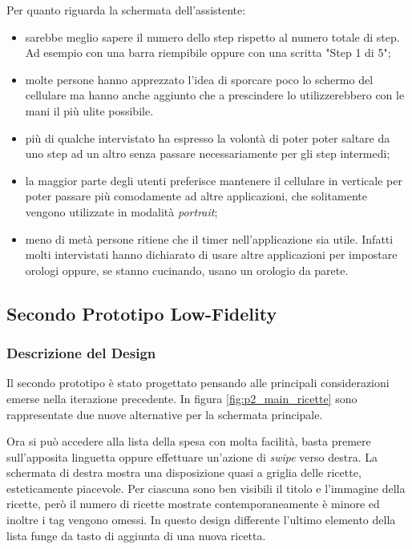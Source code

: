 Per quanto riguarda la schermata dell'assistente:
\begin{itemize}
  \item sarebbe meglio sapere il numero dello step rispetto al numero totale di step.
    Ad esempio con una barra riempibile oppure con una scritta "Step 1 di 5";

  \item molte persone hanno apprezzato l'idea di sporcare poco lo schermo del cellulare ma hanno anche aggiunto che a prescindere lo utilizzerebbero con le mani il più ulite possibile.

  \item più di qualche intervistato ha espresso la volontà di poter poter saltare da uno step ad un altro senza passare necessariamente per gli step intermedi;

  \item la maggior parte degli utenti preferisce mantenere il cellulare in verticale per poter passare più comodamente ad altre applicazioni, che solitamente vengono utilizzate in modalità \textit{portrait};

  \item meno di metà persone ritiene che il timer nell'applicazione sia utile.
    Infatti molti intervistati hanno dichiarato di usare altre applicazioni per impostare orologi oppure, se stanno cucinando, usano un orologio da parete.
\end{itemize}


\clearpage
\subsection{Secondo Prototipo Low-Fidelity}
\subsubsection{Descrizione del Design}
Il secondo prototipo è stato progettato pensando alle principali considerazioni emerse nella iterazione precedente.
In figura \ref{fig:p2_main_ricette} sono rappresentate due nuove alternative per la schermata principale.

Ora si può accedere alla lista della spesa con molta facilità, basta premere sull'apposita linguetta oppure effettuare un'azione di \textit{swipe} verso destra.
La schermata di destra mostra una disposizione quasi a griglia delle ricette, esteticamente piacevole.
Per ciascuna sono ben visibili il titolo e l'immagine della ricette, però il numero di ricette mostrate contemporaneamente è minore ed inoltre i tag vengono omessi.
In questo design differente l'ultimo elemento della lista funge da tasto di aggiunta di una nuova ricetta.

